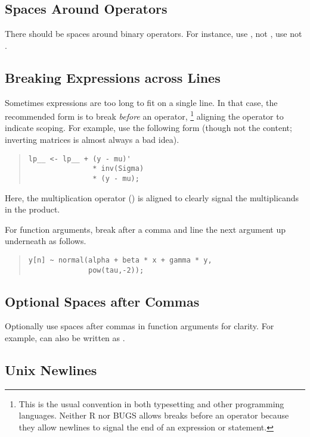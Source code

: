 \subsection{Spaces Around Operators}

There should be spaces around binary operators.  For instance, use
, not , use  not
.

\subsection{Breaking Expressions across Lines}

Sometimes expressions are too long to fit on a single line.  In that
case, the recommended form is to break \emph{before} an operator,%
%
\footnote{This is the usual convention in both typesetting and other
  programming languages. Neither R nor BUGS allows breaks before an
  operator because they allow newlines to signal the end of an
  expression or statement.}
%
aligning the operator to indicate scoping.  For example, use the
following form (though not the content; inverting matrices is almost
always a bad idea).
%
\begin{quote}
\begin{Verbatim}
lp__ <- lp__ + (y - mu)'
               * inv(Sigma) 
               * (y - mu);
\end{Verbatim}
\end{quote}
%
Here, the multiplication operator (\code{*}) is aligned to clearly
signal the multiplicands in the product.  

For function arguments, break after a comma and line the next
argument up underneath as follows.
%
\begin{quote}
\begin{Verbatim}
y[n] ~ normal(alpha + beta * x + gamma * y,
              pow(tau,-2));
\end{Verbatim}
\end{quote}
%

\subsection{Optional Spaces after Commas}

Optionally use spaces after commas in function arguments for clarity.
For example,  can also be
written as .



\subsection{Unix Newlines}

